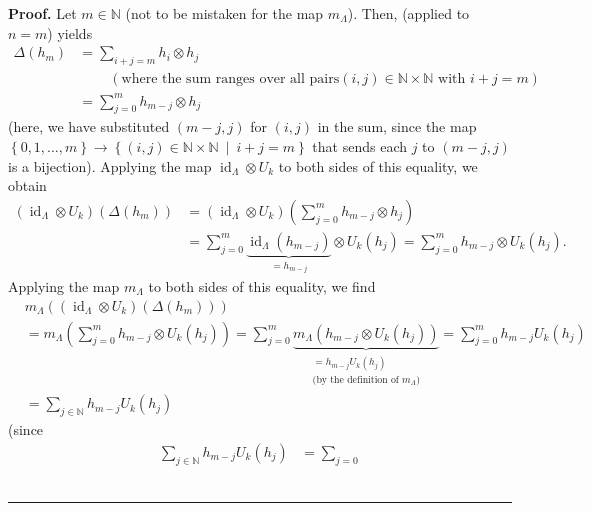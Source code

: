 \documentclass[numbers=enddot,12pt,final,onecolumn,notitlepage]{scrartcl}%
\theoremstyle{definition}
\newenvironment{proof}[1][Proof]{\noindent\textbf{#1.} }{\ \rule{0.5em}{0.5em}}
\let\sumnonlimits\sum
\renewcommand{\sum}{\sumnonlimits\limits}
\newenvironment{verlong}{}{}
\begin{document}
\begin{proof}
\begin{verlong}
Let $m\in\mathbb{N}$ (not to be mistaken for the map $m_{\Lambda}$). Then,
\cite[Proposition 2.3.6(iii)]{GriRei} (applied to $n=m$) yields
\begin{align*}
\Delta\left(  h_{m}\right)   &  =\sum_{i+j=m}h_{i}\otimes h_{j}\\
&  \ \ \ \ \ \ \ \ \ \ \left(  \text{where the sum ranges over all pairs
}\left(  i,j\right)  \in\mathbb{N}\times\mathbb{N}\text{ with }i+j=m\right) \\
&  =\sum_{j=0}^{m}h_{m-j}\otimes h_{j}%
\end{align*}
(here, we have substituted $\left(  m-j,j\right)  $ for $\left(  i,j\right)  $
in the sum, since the map $\left\{  0,1,\ldots,m\right\}  \rightarrow\left\{
\left(  i,j\right)  \in\mathbb{N}\times\mathbb{N}\ \mid\ i+j=m\right\}  $ that
sends each $j$ to $\left(  m-j,j\right)  $ is a bijection). Applying the map
$\operatorname*{id}\nolimits_{\Lambda}\otimes U_{k}$ to both sides of this
equality, we obtain%
\begin{align*}
\left(  \operatorname*{id}\nolimits_{\Lambda}\otimes U_{k}\right)  \left(
\Delta\left(  h_{m}\right)  \right)   &  =\left(  \operatorname*{id}%
\nolimits_{\Lambda}\otimes U_{k}\right)  \left(  \sum_{j=0}^{m}h_{m-j}\otimes
h_{j}\right) \\
&  =\sum_{j=0}^{m}\underbrace{\operatorname*{id}\nolimits_{\Lambda}\left(
h_{m-j}\right)  }_{=h_{m-j}}\otimes U_{k}\left(  h_{j}\right)  =\sum_{j=0}%
^{m}h_{m-j}\otimes U_{k}\left(  h_{j}\right)  .
\end{align*}
Applying the map $m_{\Lambda}$ to both sides of this equality, we find%
\begin{align*}
&  m_{\Lambda}\left(  \left(  \operatorname*{id}\nolimits_{\Lambda}\otimes
U_{k}\right)  \left(  \Delta\left(  h_{m}\right)  \right)  \right) \\
&  =m_{\Lambda}\left(  \sum_{j=0}^{m}h_{m-j}\otimes U_{k}\left(  h_{j}\right)
\right)  =\sum_{j=0}^{m}\underbrace{m_{\Lambda}\left(  h_{m-j}\otimes
U_{k}\left(  h_{j}\right)  \right)  }_{\substack{=h_{m-j}U_{k}\left(
h_{j}\right)  \\\text{(by the definition of }m_{\Lambda}\text{)}}}=\sum
_{j=0}^{m}h_{m-j}U_{k}\left(  h_{j}\right) \\
&  =\sum_{j\in\mathbb{N}}h_{m-j}U_{k}\left(  h_{j}\right)
\end{align*}
(since%
\begin{align*}
\sum_{j\in\mathbb{N}}h_{m-j}U_{k}\left(  h_{j}\right)   &  =\sum_{j=0}%

\end{align*}
\end{verlong}
\end{proof}
\end{document}

